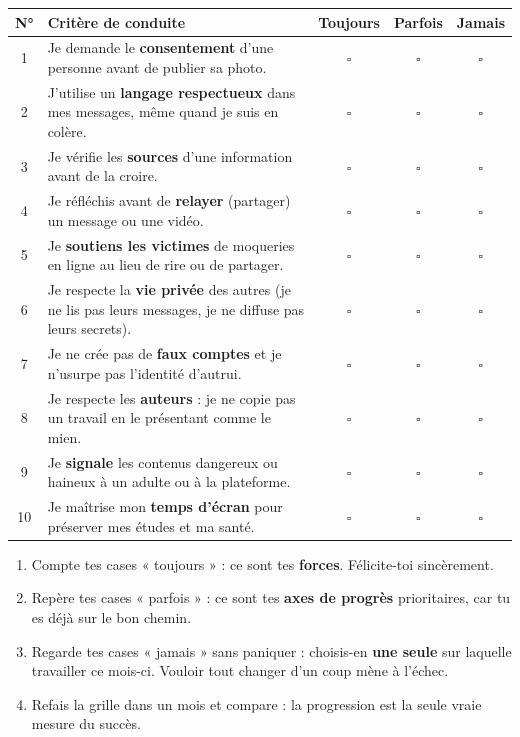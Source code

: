\documentclass[11pt]{article}
\begin{document}
\begin{center}
\begin{tabularx}{\linewidth}{|c|X|c|c|c|}
\hline
\rowcolor{popblueL} \textbf{N°} & \textbf{Critère de conduite} & \textbf{Toujours} & \textbf{Parfois} & \textbf{Jamais} \\
\hline
1 & Je demande le \textbf{consentement} d'une personne avant de publier sa photo. & $\square$ & $\square$ & $\square$ \\
\hline
2 & J'utilise un \textbf{langage respectueux} dans mes messages, même quand je suis en colère. & $\square$ & $\square$ & $\square$ \\
\hline
3 & Je vérifie les \textbf{sources} d'une information avant de la croire. & $\square$ & $\square$ & $\square$ \\
\hline
4 & Je réfléchis avant de \textbf{relayer} (partager) un message ou une vidéo. & $\square$ & $\square$ & $\square$ \\
\hline
5 & Je \textbf{soutiens les victimes} de moqueries en ligne au lieu de rire ou de partager. & $\square$ & $\square$ & $\square$ \\
\hline
6 & Je respecte la \textbf{vie privée} des autres (je ne lis pas leurs messages, je ne diffuse pas leurs secrets). & $\square$ & $\square$ & $\square$ \\
\hline
7 & Je ne crée pas de \textbf{faux comptes} et je n'usurpe pas l'identité d'autrui. & $\square$ & $\square$ & $\square$ \\
\hline
8 & Je respecte les \textbf{auteurs} : je ne copie pas un travail en le présentant comme le mien. & $\square$ & $\square$ & $\square$ \\
\hline
9 & Je \textbf{signale} les contenus dangereux ou haineux à un adulte ou à la plateforme. & $\square$ & $\square$ & $\square$ \\
\hline
10 & Je maîtrise mon \textbf{temps d'écran} pour préserver mes études et ma santé. & $\square$ & $\square$ & $\square$ \\
\hline
\end{tabularx}
\end{center}

\begin{methode}
\begin{enumerate}
\item Compte tes cases « toujours » : ce sont tes \textbf{forces}. Félicite-toi sincèrement.
\item Repère tes cases « parfois » : ce sont tes \textbf{axes de progrès} prioritaires, car tu es déjà sur le bon chemin.
\item Regarde tes cases « jamais » sans paniquer : choisis-en \textbf{une seule} sur laquelle travailler ce mois-ci. Vouloir tout changer d'un coup mène à l'échec.
\item Refais la grille dans un mois et compare : la progression est la seule vraie mesure du succès.
\end{enumerate}
\end{methode}
\end{document}
